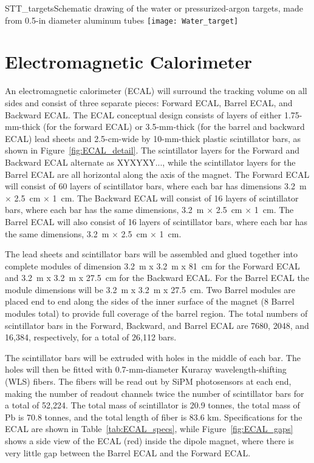 \begin{cdrfigure}{STT_targets}{Schematic drawing of the water or pressurized-argon targets, 
made from 0.5-in diameter aluminum tubes}
\texttt{[image: Water\_target]}
\end{cdrfigure}

\section{Electromagnetic Calorimeter}

An electromagnetic calorimeter 
(ECAL) will surround the tracking volume on all sides and consist of three separate pieces: Forward ECAL, Barrel ECAL, and Backward ECAL. 
The ECAL conceptual design 
consists of 
layers of either 1.75-mm-thick (for the forward ECAL) or 3.5-mm-thick 
(for the barrel and backward ECAL) lead sheets and 2.5-cm-wide by 10-mm-thick 
plastic scintillator bars,
as shown in Figure~\ref{fig:ECAL_detail}. The scintillator layers for the
Forward and Backward ECAL alternate as XYXYXY..., while the scintillator 
layers for the Barrel ECAL are all horizontal along the axis of the magnet.
The Forward ECAL will consist of 60 layers of scintillator bars, where each
bar has dimensions 3.2~m $\times$ 2.5~cm $\times$ 1~cm. The
Backward ECAL will consist of 16 layers of scintillator bars, where each 
bar has the same dimensions, 3.2~m $\times$ 2.5~cm $\times$ 1~cm. The Barrel ECAL will also consist 
of 16 layers of scintillator bars, where each bar has the same dimensions, 
3.2~m $\times$ 2.5~cm $\times$ 1~cm. 

The lead sheets and scintillator bars will be assembled and glued together
into complete modules of dimension 3.2~m x 3.2~m x 81~cm for the Forward ECAL and
3.2~m x 3.2~m x 27.5~cm for the Backward ECAL. For the Barrel ECAL the module 
dimensions will be 3.2~m x 3.2~m x 27.5~cm. Two Barrel modules are placed end to
end along the sides of the inner surface of the magnet (8 Barrel modules
total) to provide full coverage of the barrel region.
The total numbers of scintillator bars in the
Forward, Backward, and Barrel ECAL are 7680, 2048, and 16,384, respectively, 
for a total of 26,112 bars. 

The scintillator bars will be extruded with 
holes in the middle of each bar. The
holes will then be fitted with 0.7-mm-diameter Kuraray wavelength-shifting (WLS) fibers.
The fibers will be read out by SiPM photosensors at each end, making the number of 
readout channels twice the number of scintillator bars 
for a total of 52,224. The total mass of scintillator is 20.9 tonnes, 
the total mass of Pb is 70.8 tonnes, and
the total length of fiber is 83.6 km.
Specifications for the ECAL are shown in Table~\ref{tab:ECAL_specs}, while 
Figure~\ref{fig:ECAL_gaps} shows a side view of the ECAL (red) inside the dipole
magnet, where there is very little gap between the Barrel ECAL and the Forward ECAL.


